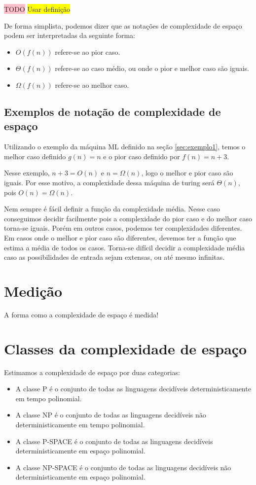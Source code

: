 \documentclass[submission,copyright,creativecommons]{eptcs}
\begin{document}
\colorbox{pink}{TODO}
\colorbox{yellow}{Usar definição\cite{usp}}

De forma simplista, podemos dizer que as notações de complexidade de espaço podem ser interpretadas da seguinte forma:

\begin{itemize}
    \item $O(f(n))$ refere-se ao pior caso.
    \item $\Theta(f(n))$ refere-se ao caso médio, ou onde o pior e melhor caso são iguais.
    \item $\Omega(f(n))$ refere-se ao melhor caso.
\end{itemize}

\subsection{Exemplos de notação de complexidade de espaço}

Utilizando o exemplo da máquina ML definido na seção \ref{sec:exemplo1}, temos o melhor caso definido $g(n)=n$ e o pior caso definido por $f(n)=n+3$.

Nesse exemplo, $n+3 = O(n)$ e $n = \Omega(n)$, logo o melhor e pior caso são iguais. Por esse motivo, a complexidade dessa máquina de turing será $\Theta(n)$, pois $O(n)=\Omega(n)$.

Nem sempre é fácil definir a função da complexidade média. Nesse caso conseguimos decidir facilmente pois a complexidade do pior caso e do melhor caso torna-se iguais. Porém em outros casos, podemos ter complexidades diferentes. Em casos onde o melhor e pior caso são diferentes, devemos ter a função que estima a média de todos os casos. Torna-se difícil decidir a complexidade média caso as possibilidades de entrada sejam extensas, ou até mesmo infinitas\cite{udesc}.

\section{Medição}

A forma como a complexidade de espaço é medida!

\section{Classes da complexidade de espaço}

Estimamos a complexidade de espaço por duas categorias\cite{ufpr}:

\begin{itemize}
    \item A classe P é o conjunto de todas as linguagens
decidíveis deterministicamente em tempo polinomial.
    \item A classe NP é o conjunto de todas as linguagens 
decidíveis não deterministicamente em tempo polinomial.
    \item A classe P-SPACE é o conjunto de todas as linguagens 
decidíveis deterministicamente em espaço polinomial.
    \item A classe NP-SPACE é o conjunto de todas as linguagens
decidíveis não deterministicamente em espaço polinomial.
\end{itemize}
\end{document}
